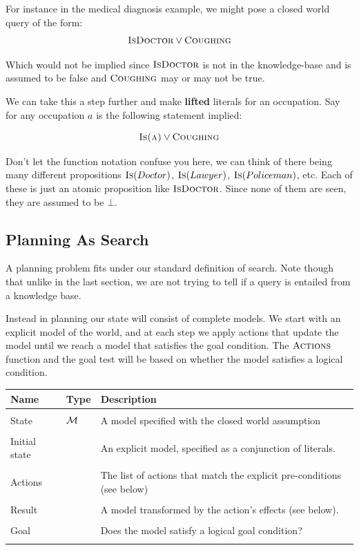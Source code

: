 \documentclass[11pt]{article}
\begin{document}
For instance in the medical diagnosis example, we might pose a 
closed world query of the form: 
 \[\mathrm{\textsc{IsDoctor}} \lor \mathrm{\textsc{Coughing}} \] 

Which would not be implied since $\mathrm{\textsc{IsDoctor}}$ is not in the knowledge-base 
and is assumed to be false and $\mathrm{\textsc{Coughing}}$ may or may not be true.

We can take this a step further and make \textbf{lifted} literals for an occupation. Say for any occupation $a$ is the following statement implied:

 \[\mathrm{\textsc{Is(a)}} \lor \mathrm{\textsc{Coughing}} \] 

\noindent Don't let the function notation confuse you here, we can think of 
there being many different propositions $\mathrm{\textsc{Is}}(Doctor)$, $\mathrm{\textsc{Is}}(Lawyer)$,
$\mathrm{\textsc{Is}}(Policeman)$, etc. Each of these is just an atomic proposition like $\mathrm{\textsc{IsDoctor}}$.
Since none of them are seen, they are assumed to be $\bot$. 




\subsection{Planning As Search}

A planning problem fits under our standard definition of search. Note
though that unlike in the last section, we are not trying to tell if a
query is entailed from a knowledge base.

Instead in planning our state will consist of complete models. We
start with an explicit model of the world, and at each step we apply
actions that update the model until we reach a model that satisfies the
goal condition. The $\mathrm{\textsc{Actions}}$ function and the goal test will be
based on whether the model satisfies a logical condition.

 \air
\begin{center}
\begin{tabularx}{\linewidth}{llX}
  \toprule
  Name  & Type & Description \\
  \midrule
\\
State & $\mathcal{M}$ & A model specified with the closed world assumption \\\\
Initial state & &  An explicit model, specified as a conjunction of literals. \\\\
Actions && The list of actions that match the explicit pre-conditions (see below)\\\\
Result && A model transformed by the action's effects (see below). \\\\
 Goal && Does the model satisfy a logical goal condition? \\\\
 \bottomrule
\end{tabularx}
\end{center}
 
\end{document}
